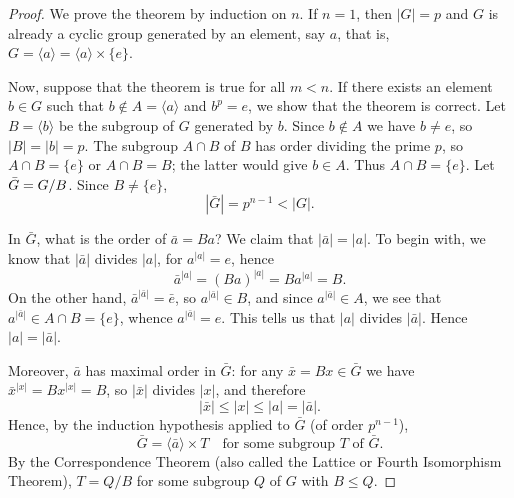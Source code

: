 \documentclass[11pt,a4paper]{article}
\begin{document}
	\begin{proof}
		We prove the theorem by induction on $n$. If $n = 1$, then $|G| = p$ and $G$ is already a cyclic group generated by an element, say $a$, that is, $G = \langle a \rangle = \langle a \rangle \times \{e\}$.
		
		\vspace{0.5em}
		\noindent Now, suppose that the theorem is true for all $m < n$. If there exists an element $b \in G$ such that $b \notin A = \langle a \rangle$ and $b^p = e$, we show that the theorem is correct. Let $B = \langle b \rangle$ be the subgroup of $G$ generated by $b$. Since $b \notin A$ we have $b \neq e$, so $|B| = |b| = p$. The subgroup $A \cap B$ of $B$ has order dividing the prime $p$, so $A \cap B = \{e\}$ or $A \cap B = B$; the latter would give $b \in A$. Thus $A \cap B = \{e\}$. Let $\Bar{G} = G/B$. Since $B \neq \{e\}$,
		\[
		|\bar{G}| = p^{n-1} < |G|.
		\]
		
		\vspace{0.5em}
		\noindent In $\bar{G}$, what is the order of $\bar{a} = Ba$? We claim that $|\bar{a}| = |a|$. To begin with, we know that $|\bar{a}|$ divides $|a|$, for $a^{|a|} = e$, hence
		\[
		\bar{a}^{|a|} = (Ba)^{|a|} = B a^{|a|} = B.
		\]
		On the other hand, $\bar{a}^{|\bar{a}|} = \bar{e}$, so $a^{|\bar{a}|} \in B$, and since $a^{|\bar{a}|} \in A$, we see that $a^{|\bar{a}|} \in A \cap B = \{e\}$, whence $a^{|\bar{a}|} = e$. This tells us that $|a|$ divides $|\bar{a}|$. Hence $|a| = |\bar{a}|$.
		
		\vspace{0.5em}
		\noindent Moreover, $\bar{a}$ has maximal order in $\bar{G}$: for any $\bar{x} = Bx \in \bar{G}$ we have $\bar{x}^{|x|} = Bx^{|x|} = B$, so $|\bar{x}|$ divides $|x|$, and therefore
		\[
		|\bar{x}| \le |x| \le |a| = |\bar{a}|.
		\]
		Hence, by the induction hypothesis applied to $\bar{G}$ (of order $p^{n-1}$),
		\[
		\bar{G} = \langle \bar{a} \rangle \times T \quad \text{for some subgroup } T \text{ of } \bar{G}.
		\]
		By the Correspondence Theorem (also called the Lattice or Fourth Isomorphism Theorem), $T = Q/B$ for some subgroup $Q$ of $G$ with $B \le Q$.
		

\end{proof}
\end{document}
